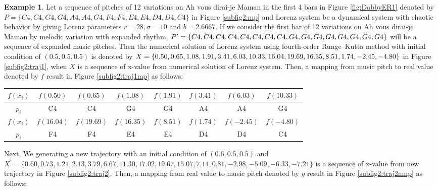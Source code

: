\documentclass[11pt]{article}
\theoremstyle{definition}
\newtheorem{example}[theorem]{Example}
\begin{document}
\begin{example}
Let a sequence of pitches of 12 variations on Ah vous dirai-je Maman in the first 4 bars in Figure \ref{fig:DabbyER1} denoted by $P = \{C4, C4, G4, G4, A4, A4, G4, F4, F4, E4, E4, D4, D4, C4 \}$ in Figure \ref{subfig2:mp} and Lorenz system be a dynamical system with chaotic behavior by giving Lorenz parameters $r = 28, \sigma=10$ and $b = 2.6667 $. If we consider the first bar of 12 variations on Ah vous dirai-je Maman by melodic variation with expanded rhythm, $P^\prime = \{C4, C4, C4, C4, C4, C4, C4, \\ C4, G4, G4, G4, G4, G4, G4, G4, G4 \}$ will be a sequence of expanded music pitches.
Then the numerical solution of Lorenz system using fourth-order Runge–Kutta method with initial condition of $(0.5,0.5,0.5)$ is denoted by $X = \{0.50, 0.65, 1.08, 1.91, 3.41, 6.03, 10.33, 16.04, 19.69, 16.35, 8.51, \\ 1.74, -2.45, -4.80\}$ in Figure \ref{subfig2:traj1}, when $X$ is a sequence of x-value from numerical solution of Lorenz system. Then, a mapping from music pitch to real value denoted by $f$ result in Figure \ref{subfig2:traj1mp} as follows:

\begin{center}
\begin{tabular}{|c||c|c|c|c|c|c|c|}
\hline
$f(x_i)$ & $f(0.50)$ & $f(0.65)$ & $f(1.08)$ & $f(1.91)$ & $f(3.41)$ & $f(6.03)$ & $f(10.33)$ \\
\hline
$p_i$ & C4 & C4 & G4 & G4 & A4 & A4 & G4 \\
\hline
$f(x_i)$ & $f(16.04)$ & $f(19.69)$ & $f(16.35)$ & $f(8.51)$ & $f(1.74)$ & $f(-2.45)$ & $f(-4.80)$ \\
\hline
$p_i$  & F4 & F4 & E4 & E4 & D4 & D4 & C4  \\
\hline
\end{tabular}
\end{center}

Next, We generating a new trajectory with an initial condition of $(0.6,0.5,0.5)$ and $X^\prime = \{ 0.60, 0.73, 1.21, 2.13, 3.79, 6.67, 11.30, 17.02, 19.67, 15.07, 7.11, 0.81, -2.98, -5.09, -6.33, -7.21 \} $ is a sequence of x-value from new trajectory in Figure \ref{subfig2:traj2}. Then, a mapping from real value to music pitch denoted by $g$ result in Figure \ref{subfig2:traj2nmp} as follows:


\end{example}
\end{document}
